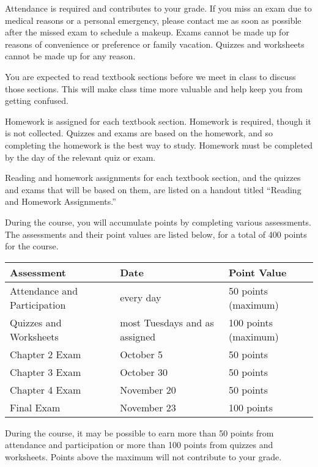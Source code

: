 \documentclass[10pt, letterpaper]{letter}
\begin{document}
Attendance is required and contributes to your grade. If you miss an
exam due to medical reasons or a personal emergency, please contact me
as soon as possible after the missed exam to schedule a makeup. Exams
cannot be made up for reasons of convenience or preference or family
vacation. Quizzes and worksheets cannot be made up for any reason.


You are expected to read textbook sections before we meet in class to
discuss those sections. This will make class time more valuable and
help keep you from getting confused.

Homework is assigned for each textbook section. Homework is required,
though it is not collected. Quizzes and exams are based on the homework,
and so completing the homework is the best way to study. Homework must
be completed by the day of the relevant quiz or exam.

Reading and homework assignments for each textbook section, and the
quizzes and exams that will be based on them, are listed on a handout
titled ``Reading and Homework Assignments.''

\newpage


During the course, you will accumulate points by completing various
assessments. The assessments and their point values are listed below,
for a total of 400 points for the course.

\begin{tabular}{l|l|l}
    \textbf{Assessment} & \textbf{Date} & \textbf{Point Value} \\
    \hline
    Attendance and Participation
        & every day & 50 points (maximum) \\
    Quizzes and Worksheets
        & most Tuesdays and as assigned & 100 points (maximum) \\
    Chapter 2 Exam & October 5   &  50 points \\
    Chapter 3 Exam & October 30  &  50 points \\
    Chapter 4 Exam & November 20 &  50 points \\
    Final Exam     & November 23 & 100 points \\
\end{tabular}

During the course, it may be possible to earn more than 50 points from
attendance and participation or more than 100 points from quizzes and
worksheets. Points above the maximum will not contribute to your grade.
\end{document}
